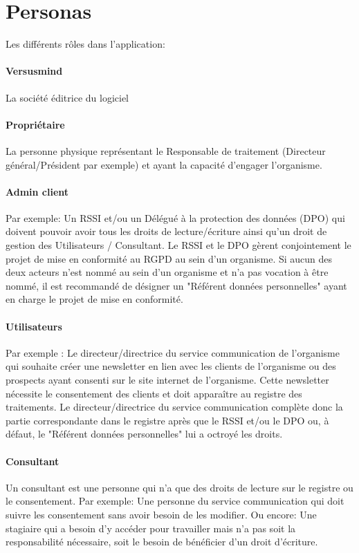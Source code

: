 \documentclass[12pt, a4paper]{report}
\begin{document}
    \chapter{Personas}
        Les différents rôles dans l'application:
        \subsubsection{Versusmind}
            La société éditrice du logiciel
        \subsubsection{Propriétaire}
            La personne physique représentant le Responsable de traitement (Directeur général/Président par exemple) et ayant la capacité d'engager l'organisme.
        \subsubsection{Admin client}
            Par exemple: Un RSSI et/ou un Délégué à la protection des données (DPO) qui doivent pouvoir avoir tous les droits de lecture/écriture ainsi qu'un droit de gestion des Utilisateurs / Consultant.\newline
            Le RSSI et le DPO gèrent conjointement le projet de mise en conformité au RGPD au sein d'un organisme.\newline
            Si aucun des deux acteurs n'est nommé au sein d'un organisme et n'a pas vocation à être nommé, il est recommandé de désigner un "Référent données personnelles" ayant en charge le projet de mise en conformité.
        \subsubsection{Utilisateurs}
            Par exemple : Le directeur/directrice du service communication de l'organisme qui souhaite créer une newsletter en lien avec les clients de l'organisme ou des prospects ayant consenti sur le site internet de l'organisme.\newline
            Cette newsletter nécessite le consentement des clients et doit apparaître au registre des traitements.\newline
            Le directeur/directrice du service communication complète donc la partie correspondante dans le registre après que le RSSI et/ou le DPO ou, à défaut, le "Référent données personnelles" lui a octroyé les droits.
        \subsubsection{Consultant}
            Un consultant est une personne qui n'a que des droits de lecture sur le registre ou le consentement.\newline
            Par exemple: Une personne du service communication qui doit suivre les consentement sans avoir besoin de les modifier.\newline
            Ou encore: Une stagiaire qui a besoin d'y accéder pour travailler mais n'a pas soit la responsabilité nécessaire, soit le besoin de bénéficier d'un droit d'écriture.\newline
    \makeutbmbackcover{}
\end{document}
